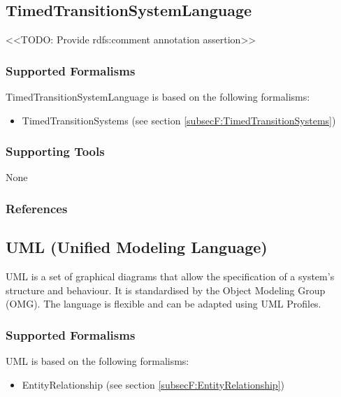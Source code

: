 \subsection{TimedTransitionSystemLanguage}
\label{subsecL:TimedTransitionSystemLanguage}


<<TODO: Provide rdfs:comment annotation assertion>>

\subsubsection{Supported Formalisms}

TimedTransitionSystemLanguage is based on the following formalisms:
\begin{itemize}
	\item TimedTransitionSystems (see section \ref{subsecF:TimedTransitionSystems})
\end{itemize}


\subsubsection{Supporting Tools}

None


\subsubsection{References}





\subsection{UML (Unified Modeling Language)}
\label{subsecL:UML}


UML is a set of graphical diagrams that allow the specification of a system's structure and behaviour.
It is standardised by the Object Modeling Group (OMG). The language is flexible and can be adapted using UML Profiles.

\subsubsection{Supported Formalisms}

UML is based on the following formalisms:
\begin{itemize}
	\item EntityRelationship (see section \ref{subsecF:EntityRelationship})
\end{itemize}


